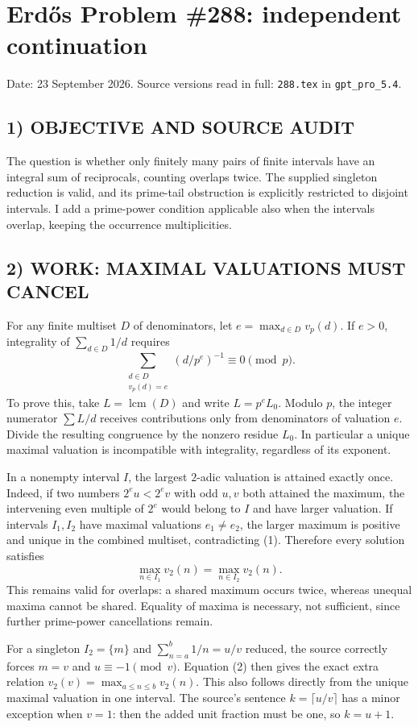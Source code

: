 \section{Erd\H{o}s Problem \#288: independent continuation}
\noindent Date: 23 September 2026. Source versions read in full: \texttt{288.tex} in \texttt{gpt\_pro\_5.4}.

\subsection*{1) OBJECTIVE AND SOURCE AUDIT}
The question is whether only finitely many pairs of finite intervals have
an integral sum of reciprocals, counting overlaps twice. The supplied
singleton reduction is valid, and its prime-tail obstruction is explicitly
restricted to disjoint intervals. I add a prime-power condition applicable
also when the intervals overlap, keeping the occurrence multiplicities.

\subsection*{2) WORK: MAXIMAL VALUATIONS MUST CANCEL}
For any finite multiset $D$ of denominators, let $e=\max_{d\in D}v_p(d)$.
If $e>0$, integrality of $\sum_{d\in D}1/d$ requires
\[
 \sum_{\substack{d\in D\\v_p(d)=e}}(d/p^e)^{-1}\equiv0\pmod p. \tag{1}
\]
To prove this, take $L=\operatorname{lcm}(D)$ and write $L=p^eL_0$.
Modulo $p$, the integer numerator $\sum L/d$ receives contributions only
from denominators of valuation $e$. Divide the resulting congruence by
the nonzero residue $L_0$. In particular a unique maximal valuation is
incompatible with integrality, regardless of its exponent.

In a nonempty interval $I$, the largest $2$-adic valuation is attained
exactly once. Indeed, if two numbers $2^eu<2^ev$ with odd $u,v$ both
attained the maximum, the intervening even multiple of $2^e$ would belong
to $I$ and have larger valuation. If intervals $I_1,I_2$ have maximal
valuations $e_1\ne e_2$, the larger maximum is positive and unique in the
combined multiset, contradicting (1). Therefore every solution satisfies
\[
 \max_{n\in I_1}v_2(n)=\max_{n\in I_2}v_2(n). \tag{2}
\]
This remains valid for overlaps: a shared maximum occurs twice, whereas
unequal maxima cannot be shared. Equality of maxima is necessary, not
sufficient, since further prime-power cancellations remain.

For a singleton $I_2=\{m\}$ and $\sum_{n=a}^b1/n=u/v$ reduced, the
source correctly forces $m=v$ and $u\equiv-1\pmod v$. Equation (2)
then gives the exact extra relation $v_2(v)=\max_{a\le n\le b}v_2(n)$.
This also follows directly from the unique maximal valuation in one
interval. The source's sentence $k=\lceil u/v\rceil$ has a minor exception
when $v=1$: then the added unit fraction must be one, so $k=u+1$.

